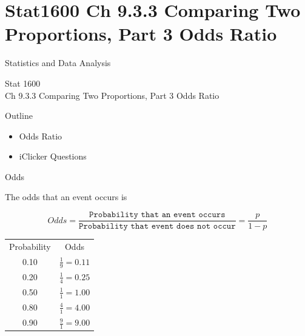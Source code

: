 \documentclass[14pt]{beamer}\usepackage[]{graphicx}\usepackage[]{color}
\begin{document}

\section{Stat1600 Ch 9.3.3 Comparing Two  Proportions, Part 3 Odds Ratio}

\begin{frame}[fragile]{Statistics and Data Analysis}

Stat 1600 \\ Ch 9.3.3 Comparing Two  Proportions, Part 3 Odds Ratio

\end{frame}

\begin{frame}[fragile]{Outline}

\begin{itemize}
\item Odds Ratio
\item iClicker Questions
\end{itemize}
\end{frame}

\begin{frame}[fragile]{Odds}

The odds that an event occurs is

{\small{
\begin{equation*}
Odds = \frac{ \texttt{Probability that an event occurs}}{ \texttt{Probability that event does not occur}} = \frac{p}{1 - p}
\end{equation*}
}}

\begin{table}[ht]
\centering
\begin{tabular}{@{} cc @{}} \hline
Probability & Odds \\
0.10 & $\frac{1}{9} = 0.11$ \\
0.20 & $\frac{1}{4} = 0.25$ \\
0.50 & $\frac{1}{1} = 1.00$ \\
0.80 & $\frac{4}{1} = 4.00$ \\
0.90 & $\frac{9}{1} = 9.00$ \\
\end{tabular}
\end{table}
\end{frame}
\end{document}
